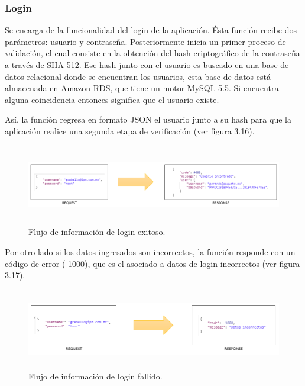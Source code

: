 \subsubsection{Login}
Se encarga de la funcionalidad del login de la aplicación. Ésta función recibe dos parámetros: usuario y contraseña. Posteriormente inicia un primer proceso de validación, el cual consiste en la obtención del hash criptográfico de la contraseña a través de SHA-512. Ese hash junto con el usuario es buscado en una base de datos relacional donde se encuentran los usuarios, esta base de datos está almacenada en Amazon RDS, que tiene un motor MySQL 5.5. Si encuentra alguna coincidencia entonces significa que el usuario existe.\par Así, la función regresa en formato JSON el usuario junto a su hash para que la aplicación realice una segunda etapa de verificación (ver figura 3.16). \par
\begin{figure}[h!]
	\centering
	\includegraphics[width=15cm,height=3.5cm]{imagenes/desarrollo/arquitectura/LOGIN_SUCCESS.png}
	\caption{Flujo de información de login exitoso.}
	\label{fig:loginsuccess}
\end{figure}

Por otro lado si los datos ingresados son incorrectos, la función responde con un código de error (-1000), que es el asociado a datos de login incorrectos (ver figura 3.17). 
\begin{figure}[h!]
	\centering
	\includegraphics[width=15cm,height=3.5cm]{imagenes/desarrollo/arquitectura/LOGIN_FAIL.png}
	\caption{Flujo de información de login fallido.}
	\label{fig:loginfail}
\end{figure}

